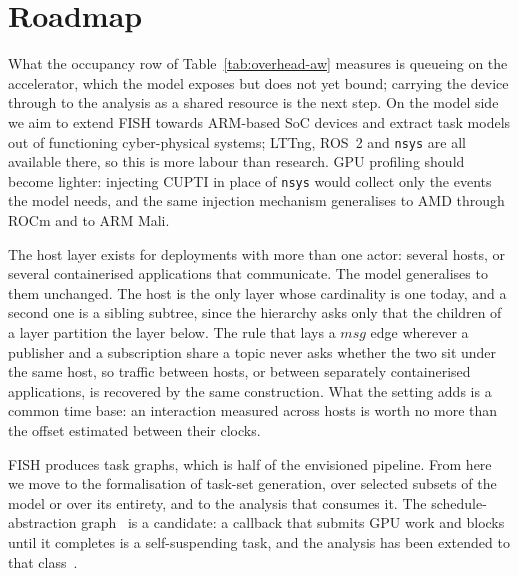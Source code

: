 \section{Roadmap}
\label{sec:roadmap}

What the occupancy row of Table~\ref{tab:overhead-aw} measures is queueing on
the accelerator, which the model exposes but does not yet bound; carrying the
device through to the analysis as a shared resource is the next step. On the model side we aim to extend FISH towards
ARM-based SoC devices and extract task models out of functioning cyber-physical
systems; LTTng, ROS~2 and \texttt{nsys} are all available there, so this is more
labour than research. GPU profiling should become lighter: injecting CUPTI in
place of \texttt{nsys} would collect only the events the model needs, and the
same injection mechanism generalises to AMD through ROCm and to ARM Mali.

The host layer exists for deployments with more than one actor: several hosts, or
several containerised applications that communicate. The model generalises to
them unchanged. The host is the only layer whose cardinality is one today, and a
second one is a sibling subtree, since the hierarchy asks only that the children
of a layer partition the layer below. The rule that lays a $\mathit{msg}$ edge
wherever a publisher and a subscription share a topic never asks whether the two
sit under the same host, so traffic between hosts, or between separately
containerised applications, is recovered by the same construction. What the
setting adds is a common time base: an interaction measured across hosts is worth
no more than the offset estimated between their clocks.

FISH produces task graphs, which is half of the envisioned pipeline. From here we
move to the formalisation of task-set generation, over selected subsets of the
model or over its entirety, and to the analysis that consumes it. The
schedule-abstraction graph~\cite{nasri-2017-sagproposed} is a candidate: a
callback that submits GPU work and blocks until it completes is a self-suspending
task, and the analysis has been extended to that
class~\cite{nidhi-2024-sagedd}.
